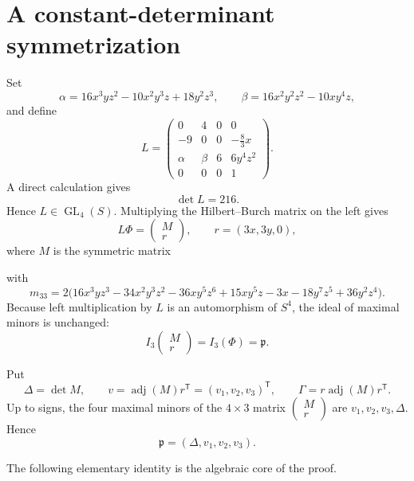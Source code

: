 \documentclass[11pt]{amsart}
\theoremstyle{remark}
\DeclareMathOperator{\adj}{adj}
\begin{document}
\section{A constant-determinant symmetrization}\label{sec:sym}
Set
\[
 \alpha=16x^3yz^2-10x^2y^3z+18y^2z^3,
 \qquad
 \beta=16x^2y^2z^2-10xy^4z,
\]
and define
\[
L=
\begin{pmatrix}
0&4&0&0\\
-9&0&0&-\frac83x\\
\alpha&\beta&6&6y^4z^2\\
0&0&0&1
\end{pmatrix}.
\]
A direct calculation gives
\[
 \det L=216.
\]
Hence $L\in\operatorname{GL}_4(S)$.  Multiplying the Hilbert--Burch matrix on the left gives
\[
 L\Phi=
 \begin{pmatrix}
 M\\ r
 \end{pmatrix},
 \qquad r=(3x,3y,0),
\]
where $M$ is the symmetric matrix
\begin{center}
\end{center}
with
\[
 m_{33}=2\bigl(16x^3yz^3-34x^2y^3z^2-36xy^5z^6+15xy^5z-3x-18y^7z^5+36y^2z^4\bigr).
\]
Because left multiplication by $L$ is an automorphism of $S^4$, the ideal of maximal minors is unchanged:
\[
 I_3\!\left(\begin{matrix}M\\r\end{matrix}\right)=I_3(\Phi)=\mathfrak p.
\]

Put
\[
 \Delta=\det M,\qquad
 v=\adj(M)r^{\mathsf T}=(v_1,v_2,v_3)^{\mathsf T},\qquad
 \Gamma=r\adj(M)r^{\mathsf T}.
\]
Up to signs, the four maximal minors of the $4\times3$ matrix $\left(\begin{smallmatrix}M\\r\end{smallmatrix}\right)$ are $v_1,v_2,v_3,\Delta$.  Hence
\begin{equation}\label{eq:p-vdelta}
 \mathfrak p=(\Delta,v_1,v_2,v_3).
\end{equation}

The following elementary identity is the algebraic core of the proof.
\end{document}
